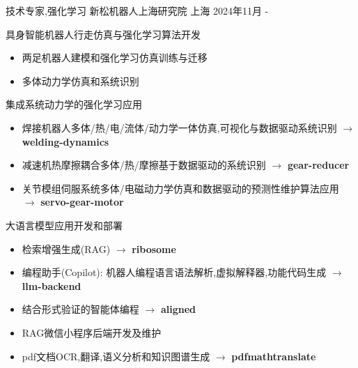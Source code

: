 \documentclass[../cv_cn.tex]{subfiles}
\begin{document}


\begin{cventries}

	\cventry
	{技术专家,强化学习} %
	{新松机器人上海研究院} %
	{上海} %
	{2024年11月 - } %
	{
		\begin{cvitems}
			\item 具身智能机器人行走仿真与强化学习算法开发
			\begin{itemize}
        \item 两足机器人建模和强化学习仿真训练与迁移
				\item 多体动力学仿真和系统识别
			\end{itemize}
			\item 集成系统动力学的强化学习应用
			\begin{itemize}
        \item 焊接机器人多体/热/电/流体/动力学一体仿真,可视化与数据驱动系统识别 $\rightarrow$ \textbf{welding-dynamics} \href{https://gitlab.com/siasunx1/welding-dynamics/}{\faGitlab}
				\item 减速机热摩擦耦合多体/热/摩擦基于数据驱动的系统识别 $\rightarrow$ \textbf{gear-reducer} \href{https://gitlab.com/siasunx1/gear-reducer/}{\faGitlab}
        \item 关节模组伺服系统多体/电磁动力学仿真和数据驱动的预测性维护算法应用 $\rightarrow$ \textbf{servo-gear-motor} \href{https://gitlab.com/siasunx1/servo-gear-motor/}{\faGitlab}
			\end{itemize}
			\item 大语言模型应用开发和部署
			\begin{itemize}
				\item 检索增强生成(RAG) $\rightarrow$ \textbf{ribosome} \href{https://gitlab.com/Binjian/ribosome}{\faGitlab}
        \item 编程助手(Copilot): 机器人编程语言语法解析,虚拟解释器,功能代码生成 $\rightarrow$ \textbf{llm-backend} \href{https://gitlab.com/siasunx1/llm-backend}{\faGitlab}
        \item 结合形式验证的智能体编程 $\rightarrow$ \textbf{aligned} \href{https://gitlab.com/Binjian/aligned}{\faGitlab}
        \item RAG微信小程序后端开发及维护
        \item pdf文档OCR,翻译,语义分析和知识图谱生成  $\rightarrow$ \textbf{pdfmathtranslate} \href{https://gitlab.com/siasunx1/pdfmathtranslate}{\faGitlab}
			\end{itemize}
		\end{cvitems}
	}


\end{cventries}
\end{document}
